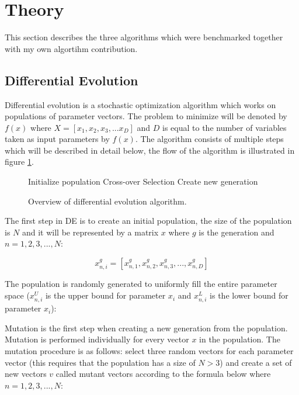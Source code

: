 \section{Theory}

This section describes the three algorithms which were benchmarked together with my own algortihm contribution.

\subsection{Differential Evolution}

Differential evolution is a stochastic optimization algorithm which works on populations of parameter vectors. The problem to minimize will be denoted by $f(x)$ where $X=[x_1,x_2,x_3,...x_D]$ and $D$ is equal to the number of variables taken as input parameters by $f(x)$. The algorithm consists of multiple steps which will be described in detail below, the flow of the algorithm is illustrated in figure \ref{figure:DE}.

\begin{figure}[h]
  \centering
  \begin{minipage}{5cm}
    \begin{algorithmic}
      \State Initialize population
      \Repeat
        \State Cross-over
        \State Selection
        \State Create new generation
    \end{algorithmic}
  \end{minipage}
  \caption{Overview of differential evolution algorithm.}
  \label{figure:DE}
\end{figure}

The first step in DE is to create an initial population, the size of the population is $N$ and it will be represented by a matrix $x$ where $g$ is the generation and $n=1,2,3,...,N$:

\begin{equation}
x_{n,i}^{g} = [ x_{n,1}^{g}, x_{n,2}^{g}, x_{n,3}^{g}, ..., x_{n,D}^{g} ]
\end{equation}

The population is randomly generated to uniformly fill the entire parameter space ($x_{n,i}^U$ is the upper bound for parameter $x_i$ and $x_{n,i}^L$ is the lower bound for parameter $x_i$):

Mutation is the first step when creating a new generation from the population. Mutation is performed individually for every vector $x$ in the population. The mutation procedure is as follows: select three random vectors for each parameter vector (this requires that the population has a size of $N > 3$) and create a set of new vectors $v$ called mutant vectors according to the formula below where $n=1,2,3,...,N$:

